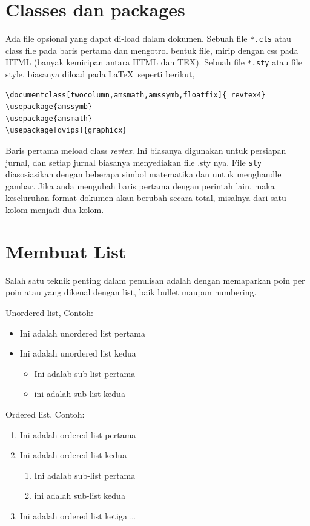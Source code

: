 \documentclass[12pt]{article}
\begin{document}
\section{Classes dan packages}
Ada file opsional yang dapat di-load dalam dokumen. Sebuah file \texttt{*.cls} atau class file pada baris pertama dan mengotrol bentuk file, mirip dengan css pada HTML (banyak kemiripan antara HTML dan TEX). Sebuah file  \texttt{*.sty} atau file style, biasanya diload pada \LaTeX\ seperti berikut,
\begin{verbatim}
\documentclass[twocolumn,amsmath,amssymb,floatfix]{ revtex4}
\usepackage{amssymb}
\usepackage{amsmath}
\usepackage[dvips]{graphicx}
\end{verbatim}

Baris pertama meload class \textit{revtex}. Ini biasanya digunakan untuk persiapan jurnal, dan setiap jurnal biasanya menyediakan file .sty nya. File \texttt{sty} diasosiasikan dengan beberapa simbol matematika dan untuk menghandle gambar. Jika anda mengubah baris pertama dengan perintah lain, maka keseluruhan format dokumen akan berubah secara total, misalnya dari satu kolom menjadi dua kolom.

\section{Membuat List}
Salah satu teknik penting dalam penulisan adalah dengan memaparkan poin per poin atau yang dikenal dengan list, baik bullet maupun numbering.

Unordered list, Contoh:
\begin{itemize}
\item Ini adalah unordered list pertama
\item Ini adalah unordered list kedua
    \begin{itemize}
    \item Ini adalab sub-list pertama
    \item ini adalah sub-list kedua
    \end{itemize}
\end{itemize}

Ordered list, Contoh:
\begin{enumerate}
\item Ini adalah ordered list pertama
\item Ini adalah ordered list kedua
    \begin{enumerate}
    \item Ini adalab sub-list pertama
    \item ini adalah sub-list kedua
    \end{enumerate}
\item Ini adalah ordered list ketiga \ldots
\end{enumerate}
\end{document}

